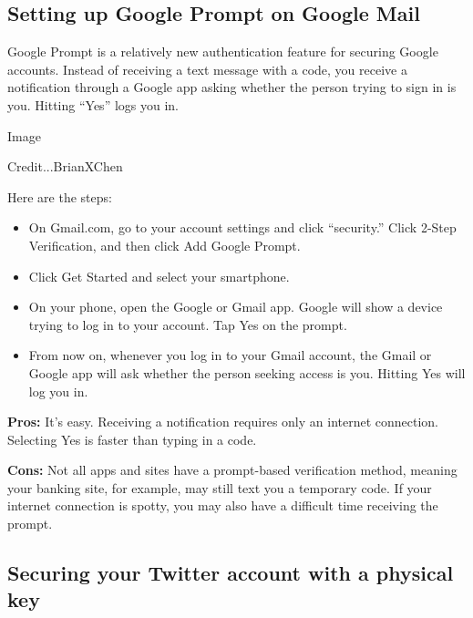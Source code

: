 \hypertarget{setting-up-google-prompt-on-google-mail}{%
\subsection{Setting up Google Prompt on Google
Mail}\label{setting-up-google-prompt-on-google-mail}}

Google Prompt is a relatively new authentication feature for securing
Google accounts. Instead of receiving a text message with a code, you
receive a notification through a Google app asking whether the person
trying to sign in is you. Hitting ``Yes'' logs you in.

Image

Credit...BrianXChen

Here are the steps:

\begin{itemize}
\tightlist
\item
  On Gmail.com, go to your account settings and click ``security.''
  Click 2-Step Verification, and then click Add Google Prompt.
\end{itemize}

\begin{itemize}
\item
  Click Get Started and select your smartphone.
\item
  On your phone, open the Google or Gmail app. Google will show a device
  trying to log in to your account. Tap Yes on the prompt.
\item
  From now on, whenever you log in to your Gmail account, the Gmail or
  Google app will ask whether the person seeking access is you. Hitting
  Yes will log you in.
\end{itemize}

\textbf{Pros:} It's easy. Receiving a notification requires only an
internet connection. Selecting Yes is faster than typing in a code.

\textbf{Cons:} Not all apps and sites have a prompt-based verification
method, meaning your banking site, for example, may still text you a
temporary code. If your internet connection is spotty, you may also have
a difficult time receiving the prompt.

\hypertarget{securing-your-twitter-account-with-a-physical-key}{%
\subsection{Securing your Twitter account with a physical
key}\label{securing-your-twitter-account-with-a-physical-key}}

